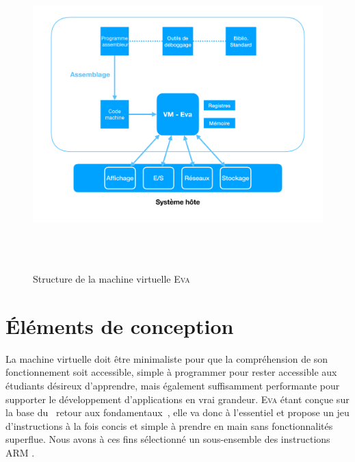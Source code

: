\documentclass[11pt]{article}
\makeatletter
\providecommand{\og}{\leavevmode\flqq~}%
\providecommand{\fg}{\ifdim\lastskip>\z@\unskip\fi~\frqq}%
\newcommand{\noun}[1]{\textsc{#1}}
\makeatother
\begin{document}
\begin{figure}[tb]
  \centering
  \includegraphics[width=12cm, height=12cm, keepaspectratio]{diagram1_graph.pdf}
  \caption{Structure de la machine virtuelle \noun{Eva}}
  \label{fig:diagram1}
\end{figure}


\section{Éléments de conception}

La machine virtuelle doit être minimaliste pour que la compréhension de son fonctionnement soit accessible, simple à programmer pour rester accessible aux étudiants désireux d'apprendre, mais également suffisamment performante pour supporter le développement d'applications en vrai grandeur. \noun{Eva} étant conçue sur la base du \og retour aux fondamentaux\fg , elle va donc à l'essentiel et propose un jeu d'instructions à la fois concis et simple à prendre en main sans fonctionnalités superflue. Nous avons à ces fins sélectionné un sous-ensemble des instructions ARM .
\end{document}
